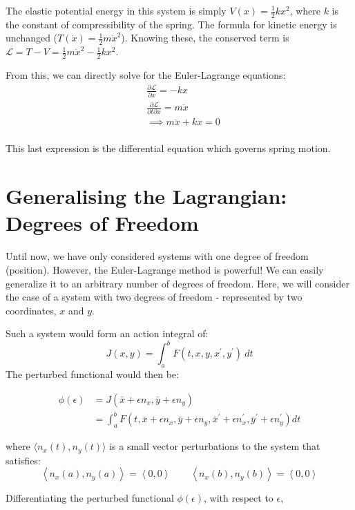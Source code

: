 \documentclass[%
 amsmath,amssymb,
aps,
 fleqn,
 notitlepage,
]{revtex4-2}
\begin{document}
The elastic potential energy in this system is simply $\displaystyle V(x) = \frac12kx^2$, where $k$ is the constant of compressibility of the spring.  The formula for kinetic energy is unchanged ($\displaystyle T(\dot x) = \frac12m\dot x^2$).  Knowing these, the conserved term is $\displaystyle \mathscr L = T - V = \frac12m\dot x^2 - \frac12kx^2$.

From this, we can directly solve for the Euler-Lagrange equations:
\begin{align*}
  &\frac{∂\mathscr L}{∂x} = -kx\\
  &\frac{∂\mathscr L}{∂t∂x} = m\ddot x\\
  &⟹ m\ddot x + kx = 0\\
\end{align*}

This last expression is the differential equation which governs spring motion.  

\section{Generalising the Lagrangian: Degrees of Freedom} %

Until now, we have only considered systems with one degree of freedom (position).  However, the Euler-Lagrange method is powerful!  We can easily generalize it to an arbitrary number of degrees of freedom.  Here, we will consider the case of a system with two degrees of freedom - represented by two coordinates, $x$ and $y$.


Such a system would form an action integral of:
\[
    J(x, y)=\int_{a}^{b} F\left(t, x, y, x^{\prime}, y^{\prime}\right) ~ dt
\]
The perturbed functional would then be:

\begin{align*}
\phi(\epsilon) &=J(\bar{x}+\epsilon n_x, \bar{y}+\epsilon n_y) \\
&=\int_{a}^{b} F\left(t, \bar{x}+\epsilon n_x, \bar{y}+\epsilon n_y, \bar{x}^{\prime}+\epsilon n_x^{\prime}, \bar{y}^{\prime}+\epsilon n_y^{\prime}\right) d t
\end{align*}

where $\langle n_x(t),n_y(t)\rangle$ is a small vector perturbations to the system that satisfies:
\[
    \left\langle n_x(a),n_y(a)\right\rangle = \left\langle 0,0 \right\rangle \qquad \left\langle n_x(b),n_y(b) \right\rangle = \left\langle 0,0 \right\rangle
\]

Differentiating the perturbed functional $\phi(\epsilon)$, with respect to $\epsilon$,
\end{document}
